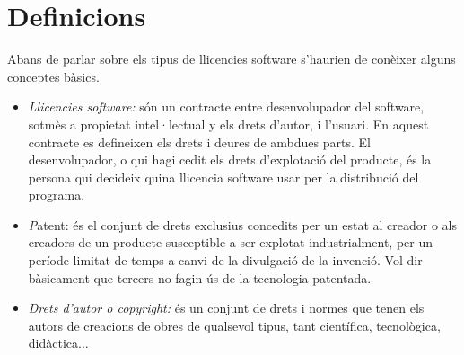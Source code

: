 \section{Definicions}
Abans de parlar sobre els tipus de llicencies software s'haurien 
de conèixer alguns conceptes bàsics.
\begin {itemize}
\item \emph{Llicencies software:} són un contracte entre desenvolupador 
del software, sotmès a propietat intel·lectual y els drets d'autor, i l'usuari. 
En aquest contracte es defineixen els drets i deures de ambdues parts. El 
desenvolupador, o qui hagi cedit els drets d'explotació del producte, és 
la persona qui decideix quina llicencia software usar per la distribució del 
programa.
\item \emph Patent: és el conjunt de drets exclusius concedits per un estat al 
creador o als creadors de un producte susceptible a ser explotat industrialment, 
per un període limitat de temps a canvi de la divulgació de la invenció. Vol dir 
bàsicament que tercers no fagin ús de la tecnologia patentada.
\item \emph{Drets d'autor o \textit{copyright}:} és un conjunt de drets i normes 
que tenen els autors de creacions de obres de qualsevol tipus, tant científica, 
tecnològica, didàctica...
\end {itemize}
